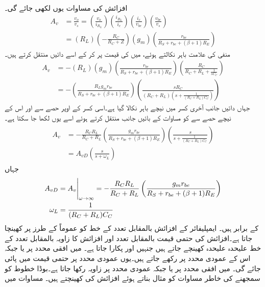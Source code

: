 افزائش کی مساوات یوں لکھی جائے گی۔ 
\begin{align*}
A_v&=\frac{v_o}{v_s}=\left(\frac{v_o}{i_{R_L}} \right ) \left(\frac{i_{R_L}}{i_c} \right ) \left (\frac{i_c}{v_{be}} \right ) \left (\frac{v_{be}}{v_s} \right )\\
&=\left(R_L \right ) \left(-\frac{R_C}{R_C+Z} \right ) \left(g_m \right ) \left (\frac{r_{be}}{R_S+r_{be}+(\beta+1)R_E} \right )
\end{align*}
منفی کی علامت باہر نکالتے ہوئے،  میں  کی قیمت پر کر کے اسے  دائیں منتقل کرتے ہیں۔
\begin{align*}
A_v&=-\left(R_L \right ) \left(g_m \right ) \left(\frac{r_{be}}{R_S+r_{be}+(\beta+1)R_E} \right ) \left (\frac{R_C}{R_C+R_L+\frac{1}{s C_C}} \right )\\
&=-\left(\frac{R_L g_m r_{be}}{R_S+r_{be}+(\beta+1)R_E} \right ) \left(\frac{s R_C}{\left(R_C+R_L \right ) \left(s+\frac{1}{(R_C+R_L)C_C} \right )} \right )
\end{align*}
جہاں دائیں جانب آخری کسر میں نیچے    باہر نکالا گیا ہے۔اسی کسر کے اوپر حصے سے  اور اس کے نیچے   حصے سے  کو مساوات کے بائیں جانب منتقل کرتے ہوئے اسے یوں لکھا جا سکتا ہے۔
\begin{gather}
\begin{aligned}
A_v&=-\frac{R_C R_L}{R_C + R_L}  \left(\frac{g_m r_{be}}{R_S+r_{be}+(\beta+1)R_E} \right ) \left(\frac{s}{s+\frac{1}{(R_C + R_L)C_C}} \right )\\
&=A_{vD} \left(\frac{s}{s+\omega_L} \right )
\end{aligned}
\end{gather}
جہاں
\begin{gather}
\begin{aligned}
A_{vD}&=\eval{A_v}_{\omega \to \infty}=-\frac{R_C R_L}{R_C + R_L}   \left(\frac{g_m r_{be}}{R_S+r_{be}+(\beta+1)R_E} \right ) \\
\omega_L&=\frac{1}{(R_C + R_L)C_C}
\end{aligned}
\end{gather}
کے برابر ہیں۔
ایمپلیفائر کے افزائش بالمقابل تعدد کے خط کو عموماً  کے طرز پر کھینچا جاتا ہے۔افزائش کی حتمی قیمت بالمقابل تعدد اور افزائش کا زاویہ بالمقابل تعدد کے خط علیحدہ علیحدہ کھینچے جاتے ہیں جنہیں  اور  پکارا جاتا ہے۔ میں افقی محدد پر  یا  جبکہ اس کے عمودی محدد پر  رکھے جاتے ہیں۔یوں عمودی محدد پر حتمی قیمت  میں پائی جائے گی۔ میں افقی محدد پر  یا  جبکہ عمودی محدد پر زاویہ  رکھا جاتا ہے۔بوڈا خطوط کو سمجھنے کی خاطر مساوات  کو مثال بناتے ہوئے افزائش کی  کھینچتے ہیں۔ مساوات میں
